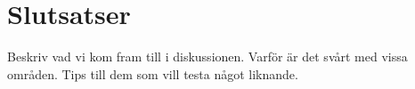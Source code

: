 
\chapter{Slutsatser}

\begin{binge}
Beskriv vad vi kom fram till i diskussionen.
Varför är det svårt med vissa områden. Tips till dem som vill testa något
liknande.
\end{binge}
